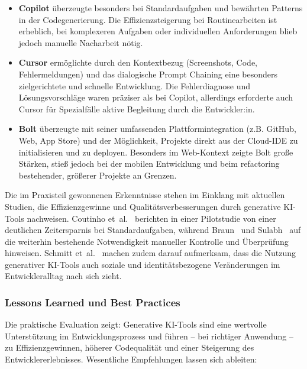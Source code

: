 \begin{itemize}
      \item \textbf{Copilot} überzeugte besonders bei Standardaufgaben und bewährten Patterns in der Codegenerierung. Die Effizienzsteigerung bei Routinearbeiten ist erheblich, bei komplexeren Aufgaben oder individuellen Anforderungen blieb jedoch manuelle Nacharbeit nötig.
      \item \textbf{Cursor} ermöglichte durch den Kontextbezug (Screenshots, Code, Fehlermeldungen) und das dialogische Prompt Chaining eine besonders zielgerichtete und schnelle Entwicklung. Die Fehlerdiagnose und Lösungsvorschläge waren präziser als bei Copilot, allerdings erforderte auch Cursor für Spezialfälle aktive Begleitung durch die Entwickler:in.
      \item \textbf{Bolt} überzeugte mit seiner umfassenden Plattformintegration (z.B. GitHub, Web, App Store) und der Möglichkeit, Projekte direkt aus der Cloud-IDE zu initialisieren und zu deployen. Besonders im Web-Kontext zeigte Bolt große Stärken, stieß jedoch bei der mobilen Entwicklung und beim refactoring bestehender, größerer Projekte an Grenzen.
\end{itemize}

Die im Praxisteil gewonnenen Erkenntnisse stehen im Einklang mit aktuellen
Studien, die Effizienzgewinne und Qualitätsverbesserungen durch generative
KI-Tools nachweisen. Coutinho et~al.~\cite{coutinho_role_2024} berichten in
einer Pilotstudie von einer deutlichen Zeitersparnis bei Standardaufgaben,
während Braun~\cite{braun_ki_2024} und Sulabh~\cite{s_future_2024} auf die
weiterhin bestehende Notwendigkeit manueller Kontrolle und Überprüfung
hinweisen. Schmitt et~al.~\cite{schmitt_generative_2024} machen zudem darauf
aufmerksam, dass die Nutzung generativer KI-Tools auch soziale und
identitätsbezogene Veränderungen im Entwickleralltag nach sich zieht.

\subsubsection{Lessons Learned und Best Practices}

Die praktische Evaluation zeigt: Generative KI-Tools sind eine wertvolle
Unterstützung im Entwicklungsprozess und führen – bei richtiger Anwendung – zu
Effizienzgewinnen, höherer Codequalität und einer Steigerung des
Entwicklererlebnisses. Wesentliche Empfehlungen lassen sich ableiten:

